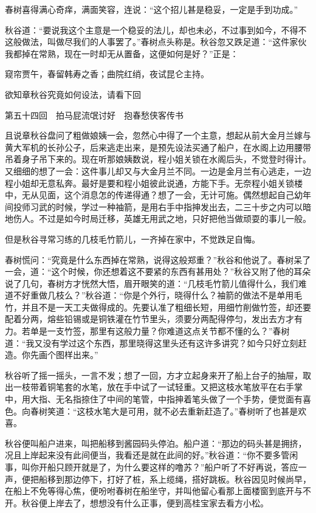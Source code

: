 \documentclass[12pt,UTF8]{ctexbook}
\begin{document}
{{{春树喜得满心奇痒，满面笑容，连说：“这个招儿甚是稳妥，一定是手到功成。”

秋谷道：“要说我这个主意是一个稳妥的法儿，却也未必，不过事到如今，不得不这般做法，叫做尽我们的人事罢了。”春树点头称是。秋谷忽又跌足道：“这件家伙我都掉在常熟，现在一时却无从置备，这便如何是好？”正是：

窥帘贾午，春留韩寿之香；曲院红绡，夜试昆仑主持。

欲知章秋谷究竟如何设法，请看下回





第五十四回　拍马屁流氓讨好　抱春愁侠客传书





且说章秋谷盘问了粗做娘姨一会，忽然心中得了一个主意，想起从前大金月兰嫁与黄大军机的长孙公子，后来逃走出来，是预先设法买通了船户，在水阁上边用腰带吊着身子吊下来的。现在听那娘姨数说，程小姐关锁在水阁后头，不觉登时得计。又细细的想了一会：这件事儿却又与大金月兰不同。一边是金月兰有心逃走，一边程小姐却无意私奔。最好是要和程小姐彼此说通，方能下手。无奈程小姐关锁楼中，无从见面，这个消息怎的传递得通？想了一会，无计可施。偶然想起自己幼年间投师习武的时候，学过一种袖箭，是用右手中指抻发出去，二三十步之内可以暗地伤人。不过是如今时局迁移，英雄无用武之地，只好把他当做顽耍的事儿一般。

但是秋谷寻常习练的几枝毛竹箭儿，一齐掉在家中，不觉跌足自悔。

春树慌问：“究竟是什么东西掉在常熟，说得这般郑重？”秋谷和他说了。春树呆了一会，道：“这个时候，你还想着这不要紧的东西有甚用处？”秋谷又附了他的耳朵说了几句，春树方才恍然大悟，眉开眼笑的道：“几枝毛竹箭儿值得什么，我们难道不好重做几枝么？”秋谷道：“你是个外行，晓得什么？袖箭的做法不是单用毛竹，并且不是一天工夫做得成的。先要认准了粗细长短，用细竹削做竹签，却还要配着分两，熔些铅锡或是铜铁灌在竹节里头，须要分两配得停匀，发出去方才有力。若单是一支竹签，那里有这般力量？你难道这点关节都不懂的么？”春树道：“我又没有学过这个东西，那里晓得这里头还有这许多讲究？如今只好立刻赶造。你先画个图样出来。”

秋谷听了摇一摇头，一言不发；想了一回，方才立起身来开了船上台子的抽屉，取出一枝带着铜笔套的水笔，放在手中试了一试轻重。又把这枝水笔放平在右手掌中，用大指、无名指捺住了中间的笔管，中指抻着笔头做了一个手势，便觉面有喜色。向春树笑道：“这枝水笔大是可用，就不必去重新赶造了。”春树听了也甚是欢喜。

秋谷便叫船户进来，叫把船移到酱园码头停泊。船户道：“那边的码头甚是拥挤，况且上岸起来没有此间便当，我看还是就在此间的好。”秋谷道：“你不要多管闲事，叫你开船只顾开就是了，为什么要这样的噜苏？”船户听了不好再说，答应一声，便把船移到那边停下，打好了桩，系上缆绳，搭好跳板。秋谷因见时候尚早，在船上不免等得心焦，便吩咐春树在船坐守，并叫他留心看那上面楼窗到底开与不开。秋谷便上岸去了，想想没有什么正事，便到高桂宝家去看方小松。

}}}
\end{document}
